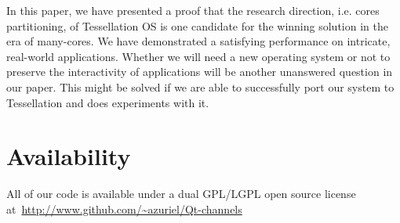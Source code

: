 \documentclass[letterpaper,twocolumn,11pt]{article}
\begin{document}
In this paper, we have presented a proof that the research direction, i.e. cores partitioning, of Tessellation OS is one candidate for the winning solution in the era of many-cores. We have demonstrated a satisfying performance on intricate, real-world applications. Whether we will need a new operating system or not to preserve the interactivity of applications will be another unanswered question in our paper. This might be solved if we are able to successfully port our system to Tessellation and does experiments with it.

\section{Availability}

All of our code is available under a dual GPL/LGPL open source license at~\url{http://www.github.com/~azuriel/Qt-channels}

\footnotesize{
}

\theendnotes
\end{document}
